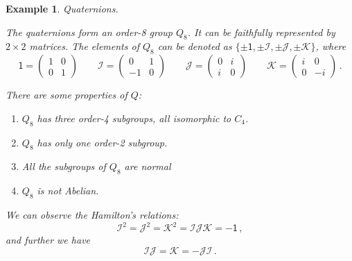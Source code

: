 \documentclass{article}
\theoremstyle{plain}\theoremheaderfont{\normalfont\itshape}\theorembodyfont{\rmfamily}\theoremseparator{.}\newtheorem*{rem}{Remark}\newtheorem*{ex}{Example}\newtheorem*{proof}{Proof}\newtheorem*{altp}{Alternative proof}
\theoremstyle{plain}\theoremheaderfont{\normalfont\bfseries}\theorembodyfont{\rmfamily}\theoremseparator{.}\newtheorem{thm}{Theorem}[section]\newtheorem{lem}[thm]{Lemma}\newtheorem{prop}[thm]{Proposition}\newtheorem*{cor}{Corollary}\newtheorem{defn}[thm]{Definition}\newtheorem{clm}[thm]{Claim}\newtheorem{clminproof}{Claim}
\theoremstyle{break}\theoremheaderfont{\normalfont\itshape}\theorembodyfont{\rmfamily}\theoremseparator{.\medskip}\newtheorem*{proofskip}{Proof}\newtheorem*{exs}{Examples}\newtheorem*{rems}{Remarks}
\theoremstyle{break}\theoremheaderfont{\normalfont\bfseries}\theorembodyfont{\rmfamily}\theoremseparator{.\medskip}\newtheorem{lemskip}[thm]{Lemma}\newtheorem{defnskip}[thm]{Definition}\newtheorem{propskip}[thm]{Proposition}\newtheorem{thmskip}[thm]{Theorem}
\numberwithin{equation}{section}
\begin{document}
	\begin{ex}
		\textit{Quaternions.}

		The quaternions form an order-8 group \(Q_8\). It can be faithfully represented by \(2\times 2\) matrices. The elements of \(Q_8\) can be denoted as \(\{\pm \mathsf{1},\pm\mathcal{I},\pm\mathcal{J},\pm\mathcal{K}\}\), where
		\[\mathsf{1}=\begin{pmatrix}
			1 & 0\\
			0 & 1
		\end{pmatrix}\qquad\mathcal{I}=\begin{pmatrix}
			0 & 1\\
			-1 & 0
		\end{pmatrix}\qquad\mathcal{J}=\begin{pmatrix}
			0 & i\\
			i & 0
		\end{pmatrix}\qquad\mathcal{K}=\begin{pmatrix}
			i & 0\\
			0 & -i
		\end{pmatrix}\,.\]

		There are some properties of \(Q\):
		\begin{enumerate}[topsep=0pt]
			\item[(i)] \(Q_8\) has three order-4 subgroups, all isomorphic to \(C_4\).
			\item[(ii)] \(Q_8\) has only one order-2 subgroup.
			\item[(iii)] All the subgroups of \(Q_8\) are normal
			\item[(iv)] \(Q_8\) is not Abelian.
		\end{enumerate}

		We can observe the \textit{Hamilton's relations}:
		\[\mathcal{I}^2=\mathcal{J}^2=\mathcal{K}^2=\mathcal{IJK}=-\mathsf{1}\,,\]
		and further we have
		\[\mathcal{IJ}=\mathcal{K}=-\mathcal{JI}\,.\]
	\end{ex}
\end{document}
